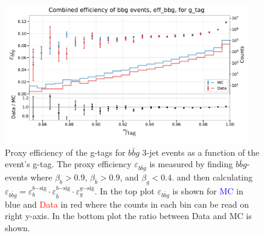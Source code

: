 \begin{figure}
  \includegraphics[width=0.95\textwidth, trim=0 0 0 40, clip]{figures/quarks/eff_bbg_gtag-down_sample=1.00-ML_vars=vertex-selection=b-ejet_min=4-n_iter_RS_lgb=99-n_iter_RS_xgb=9-cdot_cut=0.90-version=19.pdf}
  \caption[g-Tagging proxy efficiency for $b\bar{b}g$-events as function of g-tag]
          {Proxy efficiency of the g-tags for $b\bar{b}g$ 3-jet events as a function of the event's g-tag. The proxy efficiency $\varepsilon_{b\bar{b}g}$ is measured by finding $b\bar{b}g$-events where $\beta_b > 0.9$, $\beta_{\bar{b}}>0.9$, and $\beta_g < 0.4$. and then calculating  $\varepsilon_{b\bar{b}g} = \varepsilon_b^{b\mathrm{-sig}} \cdot \varepsilon_{\bar{b}}^{b\mathrm{-sig}} \cdot  \varepsilon_g^{g\mathrm{-sig}} $. In the top plot $\varepsilon_{b\bar{b}g}$ is shown for \textcolor{blue}{MC} in blue and \textcolor{red}{Data} in red where the counts in each bin can be read on right y-axis. In the bottom plot the ratio between Data and MC is shown.
          } 
  \label{fig:q:effiency_btag_bbg_gtag}
\end{figure}



